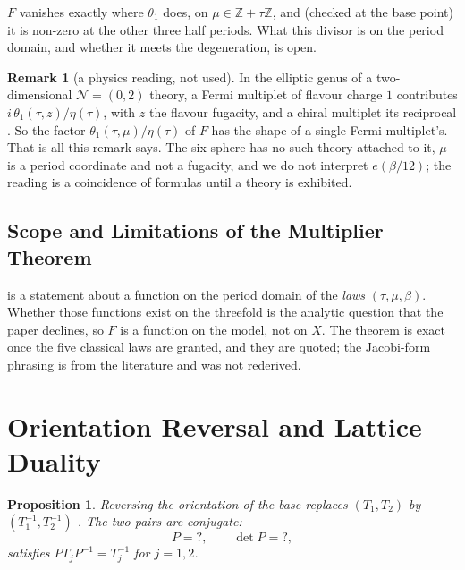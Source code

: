 \documentclass[11pt,a4paper]{article}
\newcommand{\SSMirrorConj}{?}\newcommand{\SSMirrorDet}{?}
\newcommand{\ZZ}{\mathbb{Z}}
\theoremstyle{plain}
\newtheorem{proposition}{Proposition}
\theoremstyle{definition}
\newtheorem{remark}{Remark}
\begin{document}
$F$ vanishes exactly where $\theta_1$ does, on $\mu\in\ZZ+\tau\ZZ$, and (checked at the base point) it is non-zero at the other three half
periods. What this divisor is on the period domain, and whether it meets the degeneration, is open.

\begin{remark}[a physics reading, not used]
\label{rem:theta-fermi}
In the elliptic genus of a two-dimensional $\mathcal N=(0,2)$ theory, a Fermi multiplet of flavour charge $1$ contributes
$i\,\theta_1(\tau,z)/\eta(\tau)$, with $z$ the flavour fugacity, and a chiral multiplet its reciprocal \cite[eqs.~(2.13), (2.14)]{BEHT}. So the
factor $\theta_1(\tau,\mu)/\eta(\tau)$ of $F$ has the shape of a single Fermi multiplet's. That is all this remark says. The six-sphere
has no such theory attached to it, $\mu$ is a period coordinate and not a fugacity, and we do not interpret $e(\beta/12)$; the reading is a coincidence of
formulas until a theory is exhibited.
\end{remark}

\subsection{Scope and Limitations of the Multiplier Theorem}

 is a statement about a function on the period domain of the \emph{laws} $(\tau,\mu,\beta)$. Whether those functions exist on
the threefold is the analytic question that the paper declines, so $F$ is a function on the model, not on $X$. The theorem is exact once the five classical laws are
granted, and they are quoted; the Jacobi-form phrasing is from the literature \cite{EichlerZagier} and was not rederived.


\section{Orientation Reversal and Lattice Duality}
\label{sec:mirror}

\begin{proposition}
\label{prop:achiral}
Reversing the orientation of the base replaces $(T_1, T_2)$ by
$(T_1^{-1}, T_2^{-1})$ \cite[Remark~3.18]{Alpoge}. The two pairs are
conjugate:
\[
  P = \SSMirrorConj, \qquad \det P = \SSMirrorDet,
\]
satisfies $P T_j P^{-1} = T_j^{-1}$ for $j = 1, 2$.
\end{proposition}
\end{document}
